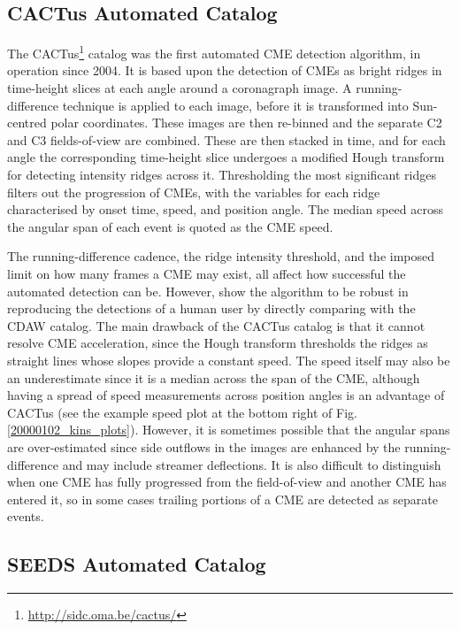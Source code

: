 \documentclass[referee,a4paper,12pt,traditabstract]{swsc}
\begin{document}
\begin{linenumbers}
\subsection{CACTus Automated Catalog}

The CACTus\footnote{\href{http://sidc.oma.be/cactus/}{http://sidc.oma.be/cactus/}} catalog was the first automated CME detection algorithm, in operation since 2004. It is based upon the detection of CMEs as bright ridges in time-height slices at each angle around a coronagraph image. A running-difference technique is applied to each image, before it is transformed into Sun-centred polar coordinates. These images are then re-binned and the separate C2 and C3 fields-of-view are combined. These are then stacked in time, and for each angle the corresponding time-height slice undergoes a modified Hough transform for detecting intensity ridges across it. Thresholding the most significant ridges filters out the progression of CMEs, with the variables for each ridge characterised by onset time, speed, and position angle. The median speed across the angular span of each event is quoted as the CME speed.

The running-difference cadence, the ridge intensity threshold, and the imposed limit on how many frames a CME may exist, all affect how successful the automated detection can be. However, \citet{2004A&A...425.1097R} show the algorithm to be robust in reproducing the detections of a human user by directly comparing with the CDAW catalog. The main drawback of the CACTus catalog is that it cannot resolve CME acceleration, since the Hough transform thresholds the ridges as straight lines whose slopes provide a constant speed. The speed itself may also be an underestimate since it is a median across the span of the CME, although having a spread of speed measurements across position angles is an advantage of CACTus (see the example speed plot at the bottom right of Fig.\,\ref{20000102_kins_plots}). However, it is sometimes possible that the angular spans are over-estimated since side outflows in the images are enhanced by the running-difference and may include streamer deflections. It is also difficult to distinguish when one CME has fully progressed from the field-of-view and another CME has entered it, so in some cases trailing portions of a CME are detected as separate events.

\subsection{SEEDS Automated Catalog}


\end{linenumbers}
\end{document}
